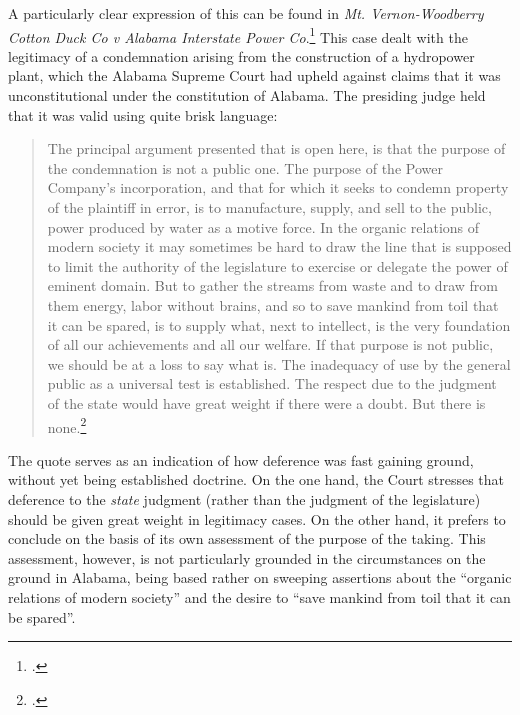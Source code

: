 A particularly clear expression of this can be found in {\it Mt. Vernon-Woodberry Cotton Duck Co v Alabama Interstate Power Co}.\footcite{vernon16}  This case dealt with the legitimacy of a condemnation arising from the construction of a hydropower plant, which the Alabama Supreme Court had upheld against claims that it was unconstitutional under the constitution of Alabama. The presiding judge held that it was valid using quite brisk language:

\begin{quote}The principal argument presented that is open here, is that the purpose of the condemnation is not a public one. The purpose of the Power Company's incorporation, and that for which it seeks to condemn property of the plaintiff in error, is to manufacture, supply, and sell to the public, power produced by water as a motive force. In the organic relations of modern society it may sometimes be hard to draw the line that is supposed to limit the authority of the legislature to exercise or delegate the power of eminent domain. But to gather the streams from waste and to draw from them energy, labor without brains, and so to save mankind from toil that it can be spared, is to supply what, next to intellect, is the very foundation of all our achievements and all our welfare. If that purpose is not public, we should be at a loss to say what is. The inadequacy of use by the general public as a universal test is established. The respect due to the judgment of the state would have great weight if there were a doubt. But there is none.\footcite[]{vernon16}
\end{quote}

The quote serves as an indication of how deference was fast gaining ground, without yet being established doctrine. On the one hand, the Court stresses that deference to the {\it state} judgment (rather than the judgment of the legislature) should be given great weight in legitimacy cases. On the other hand, it prefers to conclude on the basis of its own assessment of the purpose of the taking. This assessment, however, is not particularly grounded in the circumstances on the ground in Alabama, being based rather on sweeping assertions about the ``organic relations of modern society'' and the desire to ``save mankind from toil that it can be spared''. 

